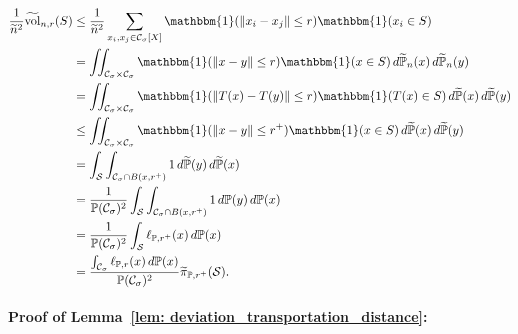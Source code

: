 \documentclass[11pt,twoside]{article}
\newcommand{\vol}{\mathrm{vol}}
\newcommand{\norm}[1]{\left\lVert#1\right\rVert}
\newcommand{\1}{\mathbbm{1}}
\newcommand{\Xbf}{X}
\newcommand{\Pbb}{\mathbb{P}}
\newcommand{\Sset}{\mathcal{S}}
\newcommand{\Cset}{\mathcal{C}}
\newcommand{\Csig}{\Cset_{\sigma}}
\newcommand{\piwt}{\widetilde{\pi}}
\begin{document}
\begin{align}
\frac{1}{\widetilde{n}^2} \widetilde{\vol}_{n,r}(S) & \leq \frac{1}{ \widetilde{n}^2} \sum_{x_i, x_j \in \Csig[\Xbf]} \1(\norm{x_i - x_j} \leq r) \1(x_i \in S) \nonumber \\
& = \iint_{\Csig \times \Csig} \1(\norm{x - y} \leq r) \1(x \in S) \,d\widetilde{\Pbb}_n(x) \,d\widetilde{\Pbb}_n(y) \nonumber \\
& = \iint_{\Csig \times \Csig} \1(\norm{T(x) - T(y)} \leq r) \1(T(x) \in S) \,d\widetilde{\Pbb}(x) \,d\widetilde{\Pbb}(y) \nonumber \\
& \leq \iint_{\Csig \times \Csig} \1(\norm{x - y} \leq r^+) \1(x \in S) \,d\widetilde{\Pbb}(x) \,d\widetilde{\Pbb}(y) \nonumber \\
& = \int_{\Sset} \int_{\Csig \cap B(x,r^+)} 1 \,d\widetilde{\Pbb}(y) \,d\widetilde{\Pbb}(x) \nonumber \\
& = \frac{1}{\Pbb(\Csig)^2}\int_{\Sset} \int_{\Csig \cap B(x,r^+)} 1 \,d\Pbb(y) \,d\Pbb(x) \nonumber \\
& = \frac{1}{\Pbb(\Csig)^2}\int_{\Sset} \ell_{\Pbb,r^+}(x) \,d\Pbb(x) \nonumber \\
& = \frac{\int_{\Csig} \ell_{\Pbb,r}(x) \,d\Pbb(x)}{\Pbb(\Csig)^2} \piwt_{\Pbb,r^+}(\Sset). \label{eqn: vol_bound}
\end{align}

\paragraph{Proof of Lemma~\ref{lem: deviation_transportation_distance}: }
\end{document}
